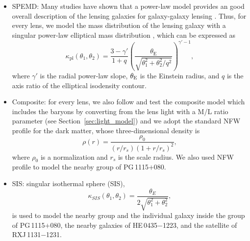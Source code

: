 \documentclass[useAMS,usenatbib]{mnras}
\newcommand\rxj{RXJ\,1131$-$1231}
\newcommand\he{HE\,0435$-$1223}
\newcommand\pg{PG\,1115$+$080}
\newcommand{\sref}[1]{Section~\ref{#1}}
\begin{document}
\begin{itemize}
  \item \textsf{SPEMD:} Many studies have shown that a power-law model provides an good overall description of the lensing galaxies for galaxy-galaxy lensing \citep[e.g.,][]{KoopmansEtal06,KoopmansEtal09,SuyuEtal09,AugerEtal10,BarnabeEtal11,SonnenfeldEtal13}. Thus, for every lens, we model the mass distribution of the lensing galaxy with a singular power-law elliptical mass distribution \citep[][]{Barkana98}, which can be expressed as 
  \begin{equation}
  \label{eq:arclight-1}
  \kappa_{\text{pl}}(\theta_{1},\theta_{2})=\frac{3-\gamma'}{1+q}\left( \frac{\theta_{\text{E}}}{\sqrt{\theta_{1}^{2}+\theta_{2}^{2}/q^2}}   \right)^{\gamma'-1},
  \end{equation}
  where $\gamma'$ is the radial power-law slope, $\theta_{\rm E}$ is the Einstein radius, and $q$ is the axis ratio of the elliptical isodensity contour. 
  
  \item \textsf{Composite:} for every lens, we also follow \citet{SuyuEtal14} and test the composite model which includes the baryons by converting from the lens light with a M/L ratio parameter (see \sref{sec:light_model}) and we adopt the standard NFW profile \citep{NavarroEtal96} for the dark matter, whose three-dimensional density is 
  \begin{equation}
    \rho(r)=\frac{\rho_{0}}{(r/r_{s})(1+r/r_{s})^2},
  \end{equation}
  where $\rho_{0}$ is a normalization and $r_{s}$ is the scale radius. We also used NFW profile to model the nearby group of \pg.
  \item \textsf{SIS:} singular isothermal sphere (SIS),
  \begin{equation}
  \kappa_{SIS}(\theta_{1},\theta_{2}) = \frac{\theta_{E}}{2\sqrt{\theta_{1}^{2}+\theta_{2}^{2}}},
  \end{equation}
  is used to model the nearby group and the individual galaxy inside the group of \pg, the nearby galaxies of \he, and the satellite of \rxj.
\end{itemize}
\end{document}
